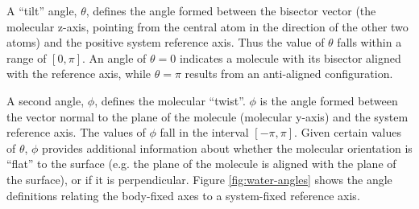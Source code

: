 	A ``tilt'' angle, $\theta$, defines the angle formed between the bisector vector (the molecular z-axis, pointing from the central atom in the direction of the other two atoms) and the positive system reference axis. Thus the value of $\theta$ falls within a range of $[0,\pi]$. An angle of $\theta=0$ indicates a molecule with its bisector aligned with the reference axis, while $\theta=\pi$ results from an anti-aligned configuration. 
	
	A second angle, $\phi$, defines the molecular ``twist''. $\phi$ is the angle formed between the vector normal to the plane of the molecule (molecular y-axis) and the system reference axis. The values of $\phi$ fall in the interval $[-\pi,\pi]$. Given certain values of $\theta$, $\phi$ provides additional information about whether the molecular orientation is ``flat'' to the surface (e.g. the plane of the molecule is aligned with the plane of the surface), or if it is perpendicular. %
	Figure \ref{fig:water-angles} shows the angle definitions relating the body-fixed axes to a system-fixed reference axis. 


